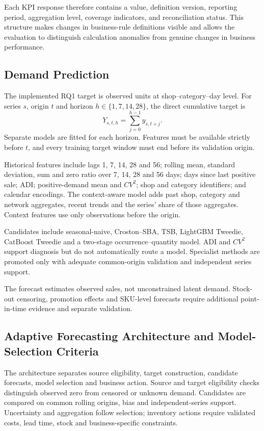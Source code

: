 \documentclass[a4paper,11pt,oneside]{book}
\theoremstyle{plain}
\theoremstyle{definition}
\theoremstyle{remark}
\begin{document}
Each KPI response therefore contains a value, definition version, reporting
period, aggregation level, coverage indicators, and reconciliation status.
This structure makes changes in business-rule definitions visible and allows
the evaluation to distinguish calculation anomalies from genuine changes in
business performance.


\subsection{Demand Prediction}
\label{subsec:demand_prediction}
The implemented RQ1 target is observed units at shop--category--day level.
For series \(s\), origin \(t\) and horizon \(h\in\{1,7,14,28\}\), the direct
cumulative target is
\[
Y_{s,t,h}=\sum_{j=0}^{h-1}y_{s,t+j}.
\]
Separate models are fitted for each horizon. Features must be available
strictly before \(t\), and every training target window must end before
its validation origin.

Historical features include lags 1, 7, 14, 28 and 56; rolling mean,
standard deviation, sum and zero ratio over 7, 14, 28 and 56 days; days
since last positive sale; ADI; positive-demand mean and \(CV^2\); shop and
category identifiers; and calendar encodings. The context-aware model
adds past shop, category and network aggregates, recent trends and the
series' share of those aggregates. Context features use only observations
before the origin.

Candidates include seasonal-naive, Croston--SBA, TSB, LightGBM Tweedie,
CatBoost Tweedie and a two-stage occurrence--quantity model. ADI and \(CV^2\)
support diagnosis but do not automatically route a model. Specialist methods
are promoted only with adequate common-origin validation and independent
series support.

The forecast estimates observed sales, not unconstrained latent demand.
Stock-out censoring, promotion effects and SKU-level forecasts require
additional point-in-time evidence and separate validation.

\subsection{Adaptive Forecasting Architecture and Model-Selection Criteria}
The architecture separates source eligibility, target construction,
candidate forecasts, model selection and business action. Source and target eligibility checks distinguish observed zero from censored or unknown demand. Candidates
are compared on common rolling origins, bias and independent-series support.
Uncertainty and aggregation follow selection; inventory actions require
validated costs, lead time, stock and business-specific constraints.
\end{document}

